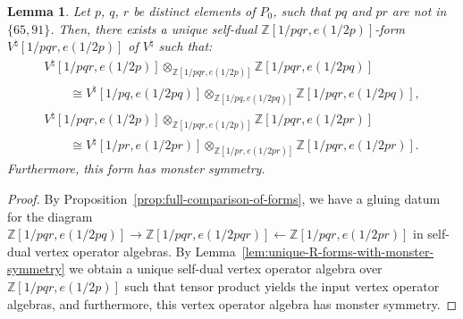 \documentclass[11pt]{article}
\newcommand{\bZ}{\mathbb{Z}}
\newtheorem{lem}[thm]{Lemma}
\theoremstyle{definition}
\begin{document}
\begin{lem} \label{lem:descent-for-three-primes}Let $p$, $q$, $r$ be distinct elements of $P_0$, such that $pq$ and $pr$ are not in $\{65, 91 \}$. Then, there exists a unique self-dual $\bZ[1/pqr, e(1/2p)]$-form $V^\natural[1/pqr, e(1/2p)]$ of $V^\natural$ such that:
\begin{gather*}
V^\natural[1/pqr, e(1/2p)] \otimes_{\bZ[1/pqr, e(1/2p)]} \bZ[1/pqr, e(1/2pq)] \\
\qquad{} \cong V^\natural[1/pq, e(1/2pq)] \otimes_{\bZ[1/pq, e(1/2pq)]} \bZ[1/pqr, e(1/2pq)], \\
V^\natural[1/pqr, e(1/2p)] \otimes_{\bZ[1/pqr, e(1/2p)]} \bZ[1/pqr, e(1/2pr)] \\
\qquad{} \cong V^\natural[1/pr, e(1/2pr)] \otimes_{\bZ[1/pr, e(1/2pr)]} \bZ[1/pqr, e(1/2pr)].
\end{gather*}
Furthermore, this form has monster symmetry.
\end{lem}
\begin{proof}By Proposition~\ref{prop:full-comparison-of-forms}, we have a gluing datum for the diagram $\bZ[1/pqr, e(1/2pq)] \to \bZ[1/pqr, e(1/2pqr)] \leftarrow \bZ[1/pqr, e(1/2pr)]$ in self-dual vertex operator algebras. By Lemma~\ref{lem:unique-R-forms-with-monster-symmetry} we obtain a unique self-dual vertex operator algebra over $\bZ[1/pqr,e(1/2p)]$ such that tensor product yields the input vertex operator algebras, and furthermore, this vertex operator algebra has monster symmetry.
\end{proof}
\end{document}
